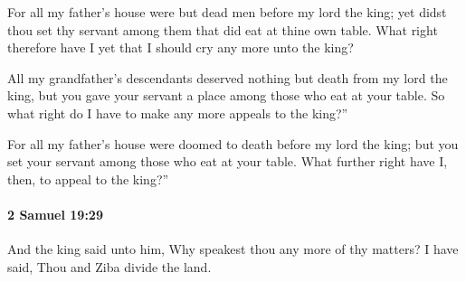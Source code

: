 			\begin{versebox}
					\item[BHS] 
					\item[ASV] For all my father's house were but dead men before my lord the king; yet didst thou set thy servant among them that did eat at thine own table. What right therefore have I yet that I should cry any more unto the king?
					\item[NIV] All my grandfather’s descendants deserved nothing but death from my lord the king, but you gave your servant a place among those who eat at your table. So what right do I have to make any more appeals to the king?”
					\item[NRSV] For all my father’s house were doomed to death before my lord the king; but you set your servant among those who eat at your table. What further right have I, then, to appeal to the king?”
			\end{versebox}

		\paragraph{2 Samuel 19:29} %
			\label{2SAMUEL-19-29}

			And the king said unto him, Why speakest thou any more of thy matters? I have said, Thou and Ziba divide the land.

